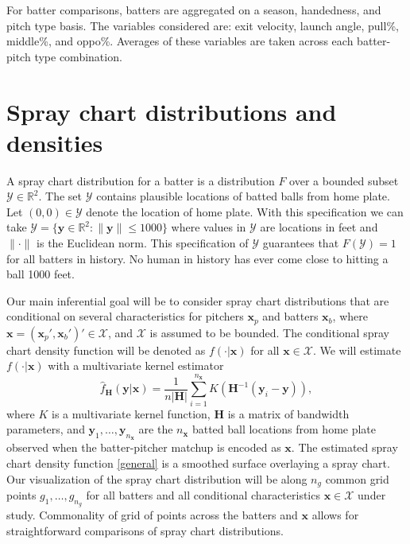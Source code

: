 \documentclass[11pt]{article}
\newcommand{\R}{\mathbb{R}}
\newcommand{\Y}{\mathcal{Y}}
\newcommand{\X}{\mathcal{X}}
\newcommand{\Hbf}{\textbf{H}}
\newcommand{\y}{\textbf{y}}
\newcommand{\x}{\textbf{x}}
\begin{document}
For batter comparisons, batters are aggregated on a season, handedness, and pitch type basis. The variables considered are: exit velocity, launch angle, pull\%, middle\%, and oppo\%. Averages of these variables are taken across each batter-pitch type combination.


\section{Spray chart distributions and densities}

A spray chart distribution for a batter is a distribution $F$ over a bounded subset $\Y \in \R^2$. The set $\Y$ contains plausible locations of batted balls from home plate. Let $(0,0) \in \Y$ denote the location of home plate. With this specification we can take $\Y = \{\y \in \R^2: \|\y\| \leq 1000\}$ where values in $\Y$ are locations in feet and $\|\cdot\|$ is the Euclidean norm. This specification of $\Y$ guarantees that $F(\Y) = 1$ for all batters in history. No human in history has ever come close to hitting a ball 1000 feet.

Our main inferential goal will be to consider spray chart distributions that are conditional on several characteristics for pitchers $\x_p$ and batters $\x_b$, where $\x = (\x_p',\x_b')' \in \X$, and $\X$ is assumed to be bounded. The conditional spray chart density function will be denoted as $f(\cdot|\x)$ for all $\x \in \X$. We will estimate $f(\cdot|\x)$ with a multivariate kernel estimator
\begin{equation} \label{general}
  \hat f_\Hbf(\y|\x) = \frac{1}{n|\Hbf|}\sum_{i=1}^{n_\x} K\left(\Hbf^{-1}(\y_i - \y)\right),
\end{equation}
where $K$ is a multivariate kernel function, $\Hbf$ is a matrix of bandwidth parameters, and 
$\y_1,\ldots,\y_{n_\x}$ are the $n_\x$ batted ball locations from home plate observed when the batter-pitcher matchup is encoded as $\x$. The estimated spray chart density function \eqref{general} is a smoothed surface overlaying a spray chart. Our visualization of the spray chart distribution will be along $n_g$ common grid points $g_1,\ldots,g_{n_g}$ for all batters and all conditional characteristics $\x \in \X$ under study. Commonality of grid of points across the batters and $\x$ allows for straightforward comparisons of spray chart distributions.
\end{document}
